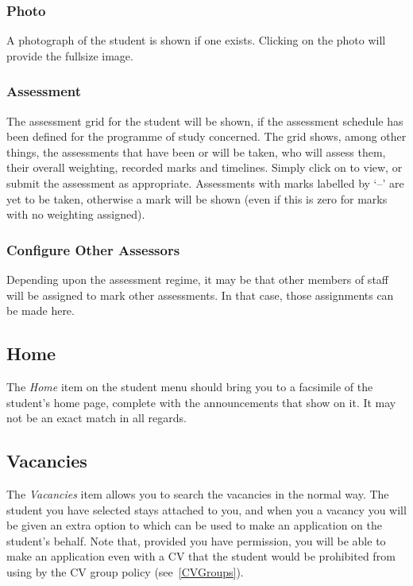 \documentclass[12 pt]{book}
\begin{document}
\subsubsection{Photo}

A photograph of the student is shown if one exists. Clicking on the photo will
provide the fullsize image.

\subsubsection{Assessment}

The assessment grid for the student will be shown, if the assessment schedule
has been defined for the programme of study concerned. The grid shows, among
other things, the assessments that have been or will be taken, who will assess
them, their overall weighting, recorded marks and timelines. Simply click on
 to view, or submit the assessment as appropriate. Assessments with marks
labelled by `--' are yet to be taken, otherwise a mark will be shown (even if
this is zero for marks with no weighting assigned).

\subsubsection{Configure Other Assessors}

Depending upon the assessment regime, it may be that other members of staff will
be assigned to mark other assessments. In that case, those assignments can be
made here.

\subsection{Home}

The \emph{Home} item on the student menu should bring you to a facsimile of the
student's home page, complete with the announcements that show on it. It may
not be an exact match in all regards.

\subsection{Vacancies}

The \emph{Vacancies} item allows you to search the vacancies in the normal way.
The student you have selected stays attached to you, and when you
 a vacancy you will be given an extra option to  which can be used to make an application on the student's
behalf. Note that, provided you have permission, you will be able to make an
application even with a CV that the student would be prohibited from using by
the CV group policy (see~\ref{CVGroups}).
\end{document}
